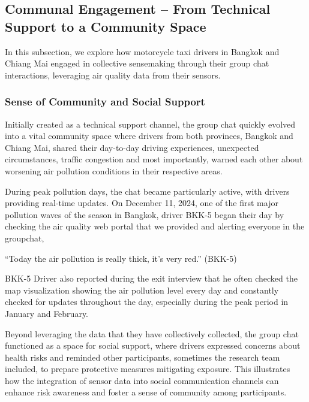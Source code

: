 \subsection{Communal Engagement -- From Technical Support to a Community Space}
\label{sec:result-communal-engagement}

In this subsection, we explore how motorcycle taxi drivers in Bangkok and Chiang Mai engaged in collective sensemaking through their group chat interactions, leveraging air quality data from their sensors. 

\subsubsection{Sense of Community and Social Support}
Initially created as a technical support channel, the group chat quickly evolved into a vital community space where drivers from both provinces, Bangkok and Chiang Mai, shared their day-to-day driving experiences, unexpected circumstances, traffic congestion and most importantly, warned each other about worsening air pollution conditions in their respective areas.  

During peak pollution days, the chat became particularly active, with drivers providing real-time updates. On December 11, 2024, one of the first major pollution waves of the season in Bangkok, driver BKK-5 began their day by checking the air quality web portal that we provided and alerting everyone in the groupchat,

\begin{quoteb}
    ``Today the air pollution is really thick, it's very red.'' (BKK-5)
\end{quoteb}

BKK-5 Driver also reported during the exit interview that he often checked the map visualization showing the air pollution level every day and constantly checked for updates throughout the day, especially during the peak period in January and February.

Beyond leveraging the data that they have collectively collected, the group chat functioned as a space for social support, where drivers expressed concerns about health risks and reminded other participants, sometimes the research team included, to prepare protective measures mitigating exposure. 
This illustrates how the integration of sensor data into social communication channels can enhance risk awareness and foster a sense of community among participants.


